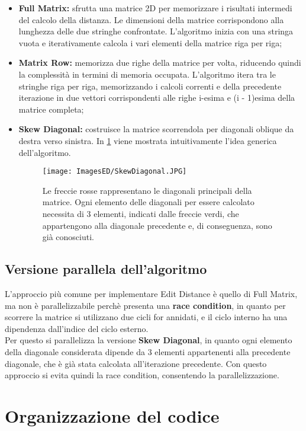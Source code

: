 \documentclass[10pt,twocolumn,letterpaper]{article}
\newcommand{\bit} {\begin{itemize} }
\newcommand{\eit} {\end{itemize} }
\begin{document}
\bit
    \item{\textbf{Full Matrix:} sfrutta una matrice 2D per memorizzare i risultati intermedi del calcolo della distanza. Le dimensioni della matrice corrispondono alla lunghezza delle due stringhe confrontate. L'algoritmo inizia con una stringa vuota e iterativamente calcola i vari elementi della matrice riga per riga;}
    \item{\textbf{Matrix Row:} memorizza due righe della matrice per volta, riducendo quindi la complessità in termini di memoria occupata. L'algoritmo itera tra le stringhe riga per riga, memorizzando i calcoli correnti e della precedente iterazione in due vettori corrispondenti alle righe i-esima e (i - 1)esima della matrice completa;}
    \item{\textbf{Skew Diagonal:} costruisce la matrice scorrendola per diagonali oblique da destra verso sinistra. In \cref{fig:sd} viene mostrata intuitivamente l'idea generica dell'algoritmo.}
    
    \begin{figure}[h]
        \centering
        \texttt{[image: ImagesED/SkewDiagonal.JPG]}
        \caption{Le freccie rosse rappresentano le diagonali principali della matrice. Ogni elemento delle diagonali per essere calcolato necessita di 3 elementi, indicati dalle freccie verdi, che appartengono alla diagonale precedente e, di conseguenza, sono già conosciuti.}
        \label{fig:sd}
    \end{figure}
    
\eit

\subsection{Versione parallela dell'algoritmo}

L'approccio più comune per implementare Edit Distance è quello di Full Matrix, ma non è parallelizzabile perchè presenta una \textbf{race condition}, in quanto per scorrere la matrice si utilizzano due cicli for annidati, e il ciclo interno ha una dipendenza dall'indice del ciclo esterno.\\
Per questo si parallelizza la versione \textbf{Skew Diagonal}, in quanto ogni elemento della diagonale considerata dipende da 3 elementi appartenenti alla precedente diagonale, che è già stata calcolata all'iterazione precedente. Con questo approccio si evita quindi la race condition, consentendo la parallelizzazione.


\section{Organizzazione del codice}
\end{document}
